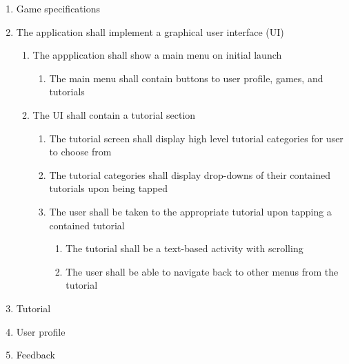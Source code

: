 \documentclass[12pt,letterpaper,oneside]{article}
\begin{document}
\begin{enumerate}
	\item
		Game specifications
	\item
		The application shall implement a graphical user interface (UI)
		\begin{enumerate}
			\item
				The appplication shall show a main menu on initial launch
				\begin{enumerate}
					\item
						The main menu shall contain buttons to user profile, games, and tutorials
				\end{enumerate}
			\item
				The UI shall contain a tutorial section
				\begin{enumerate}
					\item
						The tutorial screen shall display high level tutorial categories for user to choose from
					\item
						The tutorial categories shall display drop-downs of their contained tutorials upon being tapped
					\item
						The user shall be taken to the appropriate tutorial upon tapping a contained tutorial
						\begin{enumerate}
							\item
								The tutorial shall be a text-based activity with scrolling
							\item
								The user shall be able to navigate back to other menus from the tutorial
						\end{enumerate}
				\end{enumerate}
		\end{enumerate}
	\item
		Tutorial
	\item
		User profile
	\item
		Feedback
\end{enumerate}
\end{document}
